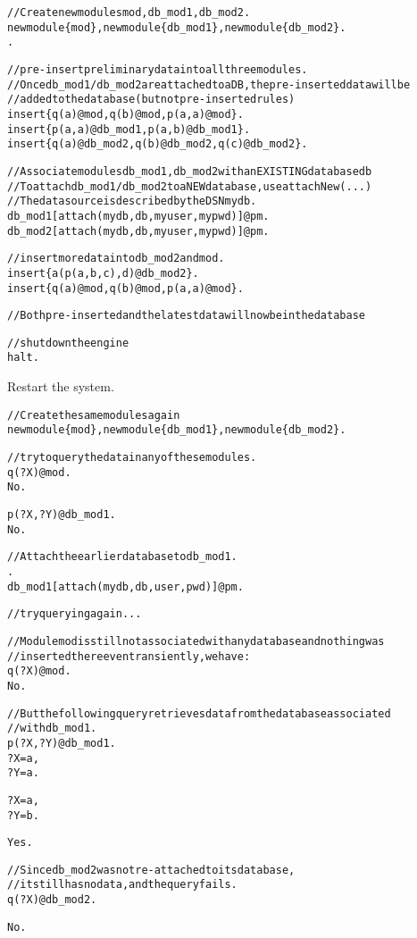 \begin{alltt}
// Create new modules mod, db_mod1, db_mod2.
\prompt newmodule\{mod\}, newmodule\{db_mod1\}, newmodule\{db_mod2\}.
\prompt [persistentmodules>>pm].

// pre-insert preliminary data into all three modules.
// Once db_mod1/db_mod2 are attached to a DB, the pre-inserted data will be
// added to the database (but not pre-inserted rules)
\prompt insert\{q(a)@mod,q(b)@mod,p(a,a)@mod\}.
\prompt insert\{p(a,a)@db_mod1, p(a,b)@db_mod1\}.
\prompt insert\{q(a)@db_mod2,q(b)@db_mod2,q(c)@db_mod2\}.

//  Associate modules db_mod1, db_mod2 with an EXISTING database db
//  To attach db_mod1/db_mod2 to a NEW database, use attachNew(...)
//  The data source is described by the DSN mydb.
\prompt db_mod1[attach(mydb,db,myuser,mypwd)]@pm.
\prompt db_mod2[attach(mydb,db,myuser,mypwd)]@pm.

// insert more data into db_mod2 and mod.
\prompt insert\{a(p(a,b,c),d)@db_mod2\}.
\prompt insert\{q(a)@mod,q(b)@mod,p(a,a)@mod\}.

// Both pre-inserted and the latest data will now be in the database

// shut down the engine
\prompt \bs{}halt.
\end{alltt}

\noindent
Restart the \FLSYSTEM system.

\begin{alltt}
// Create the same modules again
\prompt newmodule\{mod\}, newmodule\{db_mod1\}, newmodule\{db_mod2\}.

// try to query the data in any of these modules.
\prompt q(?X)@mod.
No.

\prompt p(?X,?Y)@db_mod1.
No.

//  Attach the earlier database to db_mod1.
\prompt [persistentmodules>>pm].
\prompt db_mod1[attach(mydb,db,user,pwd)]@pm.

// try querying again...

// Module mod is still not associated with any database and nothing was
// inserted there even transiently, we have:
\prompt q(?X)@mod.
No.

// But the following query retrieves data from the database associated
// with db_mod1.
\prompt p(?X,?Y)@db_mod1.
?X = a,
?Y = a.

?X = a,
?Y = b.

Yes.

// Since db_mod2 was not re-attached to its database,
// it still has no data, and the query fails.
\prompt q(?X)@db_mod2.

No.
\end{alltt}

